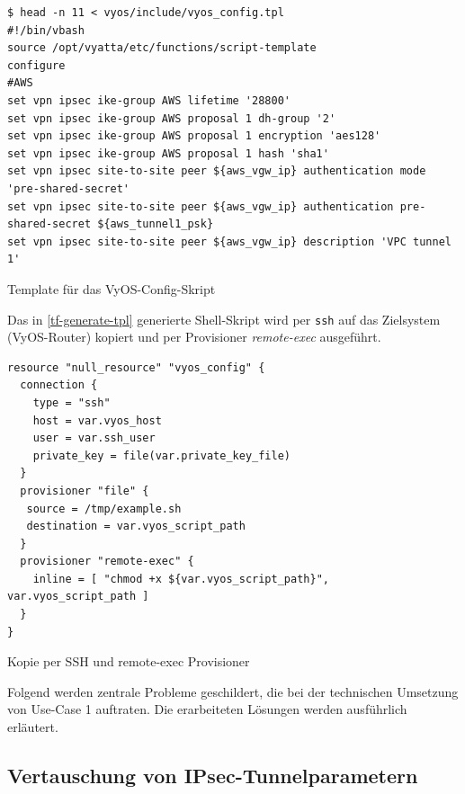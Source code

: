 \begin{listing}[h]
\begin{verbatim}
$ head -n 11 < vyos/include/vyos_config.tpl
#!/bin/vbash
source /opt/vyatta/etc/functions/script-template
configure
#AWS
set vpn ipsec ike-group AWS lifetime '28800'
set vpn ipsec ike-group AWS proposal 1 dh-group '2'
set vpn ipsec ike-group AWS proposal 1 encryption 'aes128'
set vpn ipsec ike-group AWS proposal 1 hash 'sha1'
set vpn ipsec site-to-site peer ${aws_vgw_ip} authentication mode 'pre-shared-secret'
set vpn ipsec site-to-site peer ${aws_vgw_ip} authentication pre-shared-secret ${aws_tunnel1_psk}
set vpn ipsec site-to-site peer ${aws_vgw_ip} description 'VPC tunnel 1'

\end{verbatim}
\caption{Template für das VyOS-Config-Skript}
\label{tf-generate-tpl}
\end{listing}\FloatBarrier

Das in \ref{tf-generate-tpl} generierte Shell-Skript wird per \texttt{ssh} auf das Zielsystem (VyOS-Router) kopiert und per Provisioner \textit{remote-exec} ausgeführt.
\begin{listing}[h]
\begin{verbatim}
resource "null_resource" "vyos_config" {
  connection {
    type = "ssh"
    host = var.vyos_host
    user = var.ssh_user
    private_key = file(var.private_key_file)
  }
  provisioner "file" {
   source = /tmp/example.sh
   destination = var.vyos_script_path
  }
  provisioner "remote-exec" {
    inline = [ "chmod +x ${var.vyos_script_path}", var.vyos_script_path ]
  }
}

\end{verbatim}
\caption{Kopie per \gls{SSH} und remote-exec Provisioner}
\label{tf-copy-tpl}
\end{listing}\FloatBarrier
\newpage
Folgend werden zentrale Probleme geschildert, die bei der technischen Umsetzung von Use-Case 1 auftraten. Die erarbeiteten Lösungen werden ausführlich erläutert.

\newpage
\subsection{Vertauschung von IPsec-Tunnelparametern}\label{xml-tunnel-parameters}

